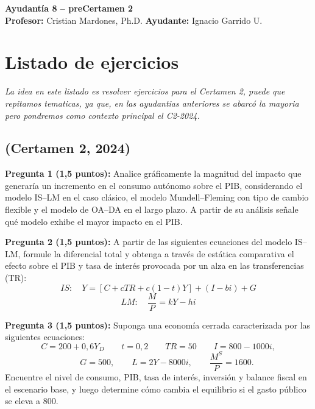 \documentclass[11pt,addpoints]{article}
\begin{document}
\vspace*{0.01cm}

\begin{center}
{\Large \bfseries Ayudantía 8 -- preCertamen 2  \\[0.5cm]}
\textbf{Profesor:} Cristian Mardones, Ph.D. \quad \textbf{Ayudante:} Ignacio Garrido U.
\end{center}


\section*{Listado de ejercicios}
\textit{La idea en este listado es resolver ejercicios para el Certamen 2, puede que repitamos tematicas, ya que, en las ayudantias anteriores se abarcó la mayoria pero pondremos como contexto principal el C2-2024.}

\subsection*{(Certamen 2, 2024)}

\textbf{Pregunta 1 (1{,}5 puntos):}  
Analice gráficamente la magnitud del impacto que generaría un incremento en el consumo autónomo sobre el PIB, considerando el modelo IS--LM en el caso clásico, el modelo Mundell--Fleming con tipo de cambio flexible y el modelo de OA--DA en el largo plazo. A partir de su análisis señale qué modelo exhibe el mayor impacto en el PIB.

\vspace{0.4cm}

\textbf{Pregunta 2 (1{,}5 puntos):}  
A partir de las siguientes ecuaciones del modelo IS--LM, formule la diferencial total y obtenga a través de estática comparativa el efecto sobre el PIB y tasa de interés provocada por un alza en las transferencias (TR):
\[
IS: \quad Y = [C + cTR + c(1 - t)Y] + (I - bi) + G
\]
\[
LM: \quad \frac{M}{P} = kY - hi
\]

\vspace{0.4cm}

\textbf{Pregunta 3 (1{,}5 puntos):}  
Suponga una economía cerrada caracterizada por las siguientes ecuaciones:
\[
C = 200 + 0{,}6Y_D \qquad t = 0{,}2 \qquad TR = 50 \qquad I = 800 - 1000i,
\]
\[
\qquad G = 500, \qquad L = 2Y - 8000i, \qquad \frac{M^S}{P} = 1600.
\]
Encuentre el nivel de consumo, PIB, tasa de interés, inversión y balance fiscal en el escenario base, y luego determine cómo cambia el equilibrio si el gasto público se eleva a 800.
\end{document}
